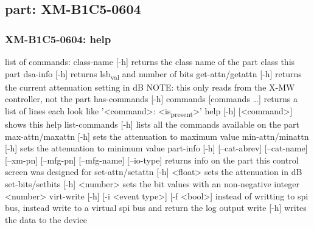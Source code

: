 \documentclass[11pt]{article}
\begin{document}
\subsection{part: XM-B1C5-0604}
\label{sec:orge7a1df5}
\subsubsection{XM-B1C5-0604: help}
\label{sec:org4286156}
list of commands:
  class-name [-h]
    returns the class name of the part class this part
  dsa-info [-h]
    returns lsb\textsubscript{val} and number of bits
  get-attn/getattn [-h]
    returns the current attenuation setting in dB
    NOTE: this only reads from the X-MW controller, not the part
  has-commands [-h] commands [commands \ldots{}]
    returns a list of lines each look like '<command>: <is\textsubscript{present}>'
  help [-h] [<command>]
    shows this help
  list-commands [-h]
    lists all the commands available on the part
  max-attn/maxattn [-h]
    sets the attenuation to maximum value
  min-attn/minattn [-h]
    sets the attenuation to minimum value
  part-info  [-h] [--cat-abrev] [--cat-name] [--xm-pn] [--mfg-pn] [--mfg-name]
          [--io-type]
    returns info on the part this control screen was designed for
  set-attn/setattn [-h] <float>
    sets the attenuation in dB
  set-bits/setbits [-h] <number>
    sets the bit values with an non-negative integer <number>
  virt-write [-h] [-i <event type>] [-f <bool>]
    instead of writting to spi bus, instead write to a virtual spi bus
    and return the log output
  write [-h]
    writes the data to the device
\end{document}
